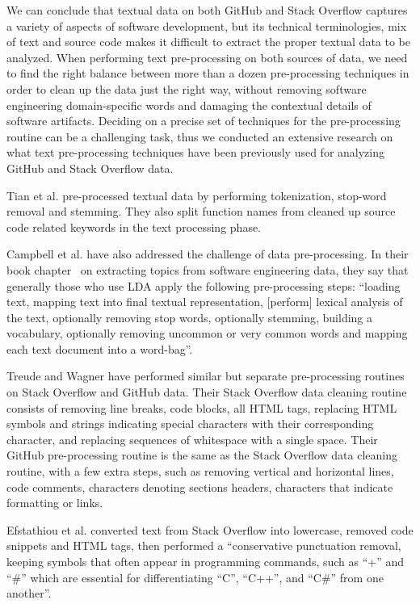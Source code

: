     We can conclude that textual data on both GitHub and Stack Overflow captures a variety of aspects of software development, but its technical terminologies, mix of text and source code makes it difficult to extract the proper textual data to be analyzed. When performing text pre-processing on both sources of data, we need to find the right balance between more than a dozen pre-processing techniques in order to clean up the data just the right way, without removing software engineering domain-specific words and damaging the contextual details of software artifacts. Deciding on a precise set of techniques for the pre-processing routine can be a challenging task, thus we conducted an extensive research on what text pre-processing techniques have been previously used for analyzing GitHub and Stack Overflow data.
    
    Tian et al. \cite{tian2013predicting} pre-processed textual data by performing tokenization, stop-word removal and stemming. They also split function names from cleaned up source code related keywords in the text processing phase.
    
    Campbell et al. have also addressed the challenge of data pre-processing. In their
    book chapter~\cite{campbell2015latent} on extracting topics from software engineering data, they say that generally those who use LDA apply the following pre-processing steps: ``loading text, mapping text into final textual representation, [perform] lexical analysis of the text, optionally removing stop words, optionally stemming, building a vocabulary, optionally removing uncommon or very common words and mapping each text document into a word-bag''. 
    
    Treude and Wagner \cite{treude2019predicting} have performed similar but separate pre-processing routines on Stack Overflow and GitHub data. Their Stack Overflow data cleaning routine consists of removing line breaks, code blocks, all HTML tags, replacing HTML symbols and strings indicating special characters with their corresponding character, and replacing sequences of whitespace with a single space. Their GitHub pre-processing routine is the same as the Stack Overflow data cleaning routine, with a few extra steps, such as removing vertical and horizontal lines, code comments, characters denoting sections headers, characters that indicate formatting or links. 
    
    Efstathiou et al. \cite{efstathiou2018word} converted text from Stack Overflow into lowercase, removed code snippets and HTML tags, then performed a ``conservative punctuation removal, keeping symbols that often appear in programming commands, such as ``+'' and ``\#'' which are essential for differentiating ``C'', ``C++'', and ``C\#'' from one another''. 
    
